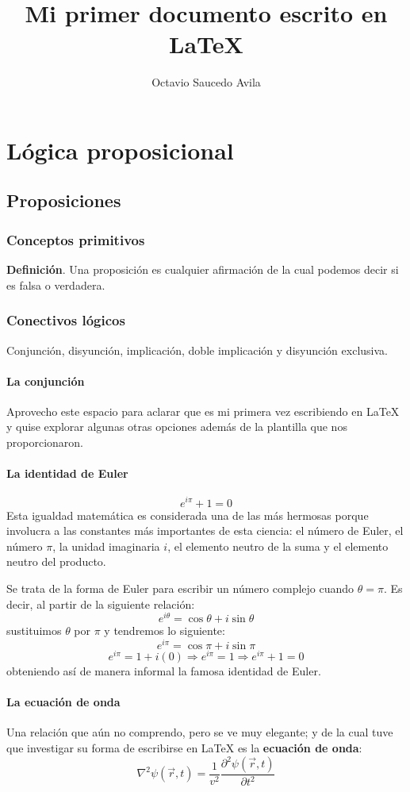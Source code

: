 \documentclass[10pt,a4paper]{book}
\title{Mi primer documento escrito en LaTeX}
\author{Octavio Saucedo Avila}
\begin{document}
\maketitle
\tableofcontents

\part{Lógica proposicional}
\chapter{Proposiciones}
\section{Conceptos primitivos}
\textbf{Definición}. Una proposición es cualquier afirmación de la cual podemos decir si es falsa o verdadera. 
\section{Conectivos lógicos}
Conjunción, disyunción, implicación, doble implicación y disyunción exclusiva. 
\subsection{La conjunción}
Aprovecho este espacio para aclarar que es mi primera vez escribiendo en LaTeX y quise explorar algunas otras opciones además de la plantilla que nos proporcionaron. 
\subsection{La identidad de Euler}
$$ e^{i \pi} + 1 = 0 $$ 
Esta igualdad matemática es considerada una de las más hermosas porque involucra a las constantes más importantes de esta ciencia: el número de Euler, el número $\pi$, la unidad imaginaria $i$, el elemento neutro de la suma y el elemento neutro del producto. 

Se trata de la forma de Euler para escribir un número complejo cuando $\theta = \pi$. Es decir, al partir de la siguiente relación: $$ e^{i \theta} = \cos{\theta} + i\sin{\theta} $$
sustituimos $\theta$ por $\pi$ y tendremos lo siguiente:
$$ e^{i \pi} = \cos{\pi}+i\sin{\pi}$$
$$ e^{i \pi}=1+i(0)\Rightarrow e^{i \pi}=1\Rightarrow  e^{i \pi} + 1 = 0 $$
obteniendo así de manera informal la famosa identidad de Euler. 
\subsection{La ecuación de onda}
Una relación que aún no comprendo, pero se ve muy elegante; y de la cual tuve que investigar su forma de escribirse en LaTeX es la \textbf{ecuación de onda}:
$$ \nabla^{2} \psi(\vec{r}, t)=\frac{1}{v^{2}} \frac{\partial^{2} \psi(\vec{r}, t)}{\partial t^{2}} $$
\end{document}
